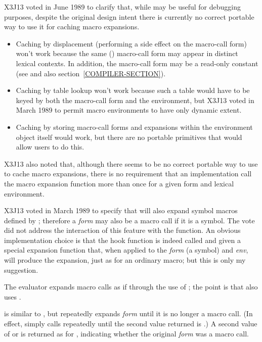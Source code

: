 \begin{defun}[Function]
\begin{newer}
X3J13 voted in June 1989  to clarify that, while
 may be useful for debugging purposes, despite
the original design intent there is
currently no correct portable way to use it for caching macro expansions.
\begin{itemize}
\item
 Caching by displacement (performing a side effect on the
 macro-call form) won't work because the same () macro-call
 form may appear in distinct lexical contexts.  In addition, the macro-call
 form may be a read-only constant (see  and also
 section~\ref{COMPILER-SECTION}).
\item
 Caching by table lookup won't work because such a table would have to
 be keyed by both the macro-call form and the environment,
 but X3J13 voted in March 1989 
 to permit macro environments to have only dynamic extent.
\item
 Caching by storing macro-call forms and expansions within the
 environment object itself would work, but there are no portable
 primitives that would allow users to do this.
\end{itemize}
X3J13 also noted that, although there seems to be no correct portable way to use
 to cache macro expansions, there is no
requirement that an implementation call the macro expansion
function more than once for a given form and lexical environment.
\end{newer}

\begin{new}
X3J13 voted in March 1989
to specify that  will also expand symbol macros
defined by ; therefore a \emph{form} may also be
a macro call if it is a symbol.  The vote did not address the interaction
of this feature with the  function.  An obvious
implementation choice is that the hook function is indeed called
and given a special expansion function that, when applied to the
\emph{form} (a symbol) and \emph{env}, will produce the expansion,
just as for an ordinary macro; but this is only my suggestion.
\end{new}

The evaluator expands macro calls as if through the use of ;
the point is that  also uses .

 is similar to ,
but repeatedly expands \emph{form} until it is no longer a macro call.
(In effect,  simply calls  repeatedly
until the second value returned is {\nil}.)
A second value of  or {\nil} is returned as for ,
indicating whether the original \emph{form} was a macro call.


\end{defun}
